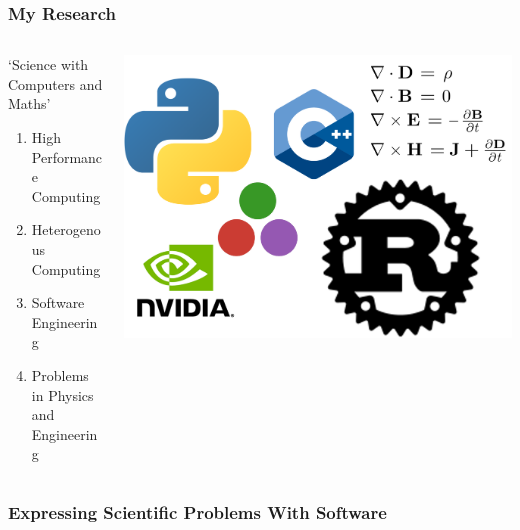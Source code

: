 \begin{frame}
    \frametitle{My Research}
    \begin{columns}
        \begin{column}{0.5\textwidth}
            `Science with Computers and Maths'
           \begin{enumerate}
               \item High Performance Computing
               \item Heterogenous Computing
               \item Software Engineering
               \item Problems in Physics and Engineering
           \end{enumerate} 
        \end{column}
        \begin{column}{0.5\textwidth}
            \begin{center}
                \begin{minipage}{0.48\textwidth}
                    \includegraphics[width=1.6\linewidth]{assets/collage.png}
                \end{minipage}
            \end{center}
        \end{column}
    \end{columns}
\end{frame}

\begin{frame}
    \frametitle{Expressing Scientific Problems With Software}
    
\end{frame}